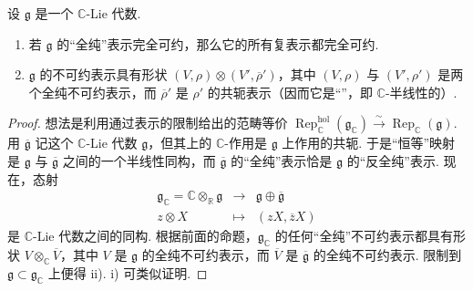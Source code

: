 \begin{corollary}\label{cor:lie-1-12-10}
设 $\mathfrak g$ 是一个 $\mathbb C$-Lie 代数.
\begin{enumerate}[label=\roman*)]
\item 若 $\mathfrak g$ 的``全纯''表示完全可约，那么它的所有复表示都完全可约.
\item $\mathfrak g$ 的不可约表示具有形状 $(V,\rho)\otimes(V',\overline{\rho}')$，其中 $(V,\rho)$ 与 $(V',\rho')$ 是两个全纯不可约表示，而 $\overline{\rho}'$ 是 $\rho'$ 的共轭表示（因而它是``''，即 $\mathbb C$-半线性的）.
\end{enumerate}
\end{corollary}
\begin{proof}
想法是利用通过表示的限制给出的范畴等价 $\operatorname{Rep}^{\mathrm{hol}}_{\mathbb C}(\mathfrak g_{\mathbb C})\xrightarrow{\ \sim\ }\operatorname{Rep}_{\mathbb C}(\mathfrak g)$. 用 $\overline{\mathfrak g}$ 记这个 $\mathbb C$-Lie 代数 $\mathfrak g$，但其上的 $\mathbb C$-作用是 $\mathfrak g$ 上作用的共轭. 于是``恒等''映射是 $\mathfrak g$ 与 $\overline{\mathfrak g}$ 之间的一个半线性同构，而 $\overline{\mathfrak g}$ 的``全纯''表示恰是 $\mathfrak g$ 的``反全纯''表示. 现在，态射
\[
\begin{array}{rcl}
\mathfrak g_{\mathbb C}=\mathbb C\otimes_{\mathbb R}\mathfrak g & \longrightarrow & \mathfrak g\oplus\overline{\mathfrak g}\\
z\otimes X & \longmapsto & (zX,\overline{z}X)
\end{array}
\]
是 $\mathbb C$-Lie 代数之间的同构. 根据前面的命题，$\mathfrak g_{\mathbb C}$ 的任何``全纯''不可约表示都具有形状 $V\otimes_{\mathbb C}\overline{V}$，其中 $V$ 是 $\mathfrak g$ 的全纯不可约表示，而 $\overline{V}$ 是 $\overline{\mathfrak g}$ 的全纯不可约表示. 限制到 $\mathfrak g\subset\mathfrak g_{\mathbb C}$ 上便得 ii). i) 可类似证明.
\end{proof}
